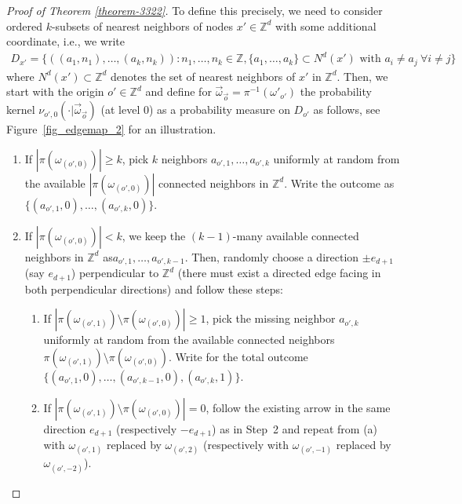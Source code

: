 \documentclass[a4paper, oneside, 11pt]{amsart}
\theoremstyle{definition}
\newcommand{\1}{\mathbbm{1}}
\newcommand{\0}{\mathbf{o}}
\newcommand{\Z}{\mathbb{Z}}
\numberwithin{equation}{section}
\begin{document}
\begin{proof}[Proof of Theorem \ref{theorem-3322}]
To define this precisely, we need to consider ordered $k$-subsets of nearest neighbors of nodes $x'\in \Z^d$ with some additional coordinate, i.e., we write 
\begin{align*}
D_{x'}
=
\{((a_{1},n_1),\dots,(a_{k},n_k))\colon n_1,\dots,n_k\in \Z, \{a_1,\dots,a_k\}
\subset N^d(x')\text{ with }a_i\neq a_j \ \forall i\neq j\}
\end{align*}
where $N^d(x')\subset\Z^d$ denotes the set of nearest neighbors of $x'$ in $\Z^d$.
Then, we start with the origin $o'\in \Z^d$ and define for $\vec\omega_{\vec o}=\pi^{-1}(\omega'_{o'})$ the probability kernel $\nu_{o',0}(\cdot|\vec\omega_{\vec o})$ (at level $0$) as a probability measure on $D_{o'}$ as follows, see Figure~\ref{fig_edgemap_2} for an illustration.
\begin{enumerate}
\item[\bf Step 1] If $|\pi(\omega_{(o',0)})|\ge k$, pick $k$ neighbors $a_{o',1},\dots,a_{o',k}$ uniformly at random from the available $|\pi(\omega_{(o',0)})|$ connected neighbors in $\Z^d$. Write the outcome as $\big\{(a_{o',1},0),\dots,(a_{o',k},0)\big\}$.
\item[\bf Step 2] If $|\pi(\omega_{(o',0)})|<k$, we keep the $(k-1)$-many available connected neighbors in $\Z^d$ as\linebreak $a_{o',1},\dots, a_{o',k-1}$. Then, randomly choose a direction $\pm e_{d+1}$ (say $e_{d+1}$) perpendicular to $\Z^d$ (there must exist a directed edge facing in both perpendicular directions) and follow these steps:
\begin{enumerate}
\item If $|\pi(\omega_{(o', 1)})\setminus \pi(\omega_{(o',0)})|\ge 1$, 
pick the missing neighbor $a_{o',k}$ uniformly at random from the available connected neighbors $\pi(\omega_{(o', 1)})\setminus \pi(\omega_{(o',0)})$. Write for the total outcome $\big\{(a_{o',1},0),\dots,(a_{o',k-1},0),(a_{o',k},1)\big\}$.
\item If $|\pi(\omega_{(o', 1)})\setminus \pi(\omega_{(o',0)})|= 0$, follow the existing arrow in the same direction $e_{d+1}$ (respectively $-e_{d+1}$) as in Step~2 and repeat from (a) with $\omega_{(o',1)}$ replaced by $\omega_{(o', 2)}$ (respectively with $\omega_{(o',-1)}$ replaced by $\omega_{(o',-2)}$).
\end{enumerate}
\end{enumerate}
\begin{figure}[h!]
\end{figure}
\end{proof}
\end{document}
